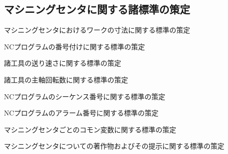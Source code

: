 \subsection{マシニングセンタに関する諸標準の策定}
\begin{enumerate}[label={\sarrow[red]}]
\item マシニングセンタにおけるワークの寸法に関する標準の策定
\item {}NCプログラムの番号付けに関する標準の策定
\item 諸工具の送り速さに関する標準の策定
\item 諸工具の主軸回転数に関する標準の策定
\item {}NCプログラムのシーケンス番号に関する標準の策定
\item[\sarrow] NCプログラムのアラーム番号に関する標準の策定
\item マシニングセンタごとのコモン変数に関する標準の策定
\item マシニングセンタについての著作物およびその提示に関する標準の策定
\end{enumerate}



